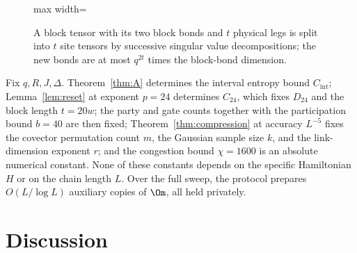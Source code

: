 \begin{figure}[t]
\centering
\begin{adjustbox}{max width=\linewidth}

\end{adjustbox}
\caption{A block tensor with its two block bonds and $t$ physical legs is split into $t$ site tensors by successive singular value decompositions; the new bonds are at most $q^{2t}$ times the block-bond dimension.}\label{fig:block-to-sites}
\end{figure}

\begin{remark}
Fix $q,R,J,\Delta$. Theorem~\ref{thm:A} determines the interval entropy bound $C_{\mathrm{int}}$;
Lemma~\ref{lem:reset} at exponent $p=24$ determines $C_{24}$, which fixes $D_{24}$ and the
block length $t=20w$; the party and gate counts together with the participation bound
$b=40$ are then fixed; Theorem~\ref{thm:compression} at accuracy $L^{-5}$
fixes the covector permutation count $m$, the Gaussian sample size $k$, and
the link-dimension exponent $r$; and the congestion bound $\chi=1600$ is an absolute numerical constant.
None of these constants depends on the specific Hamiltonian $H$ or on the chain length $L$. Over the full sweep, the protocol prepares
$O(L/\log L)$ auxiliary copies of $\Om$, all held privately.
\end{remark}

\section{Discussion}\label{sec:discussion}

